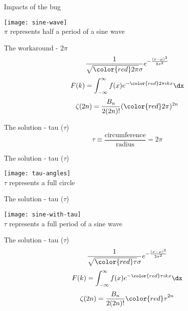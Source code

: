 \documentclass[14pt]{beamer}
\begin{document}
\begin{frame}{Impacts of the bug}
\begin{center}
\texttt{[image: sine-wave]}
\\$\pi$ represents half a period of a sine wave
\end{center}
\end{frame}

\begin{frame}{The workaround - $2\pi$}
\begin{equation*}
\frac{1}{\sqrt{\color{red}2\pi}\sigma}e^{-\frac{(x - \mu)^2}{2\sigma^2}}
\end{equation*}
\begin{equation*}
F(k) = \int_{-\infty}^{\infty}f(x)e^{-{\color{red}2\pi} i k x}\dx
\end{equation*}
\begin{equation*}
\zeta(2n) = \frac{B_n}{2(2n)!}({\color{red}2\pi})^{2n}
\end{equation*}
\end{frame}

\begin{frame}{The solution - tau ($\tau$)}
\huge
\begin{equation*}
\tau \equiv \frac{\textrm{circumference}}{\textrm{radius}} = 2\pi
\end{equation*}
\end{frame}

\begin{frame}{The solution - tau ($\tau$)}
\begin{center}
\texttt{[image: tau-angles]}
\\$\tau$ represents a full circle
\end{center}
\end{frame}

\begin{frame}{The solution - tau ($\tau$)}
\begin{center}
\texttt{[image: sine-with-tau]}
\\$\tau$ represents a full period of a sine wave
\end{center}
\end{frame}

\begin{frame}{The solution - tau ($\tau$)}
\begin{equation*}
\frac{1}{\sqrt{\color{red}\tau}\sigma}e^{-\frac{(x - \mu)^2}{2\sigma^2}}
\end{equation*}
\begin{equation*}
F(k) = \int_{-\infty}^{\infty}f(x)e^{-{\color{red}\tau} i k x}\dx
\end{equation*}
\begin{equation*}
\zeta(2n) = \frac{B_n}{2(2n)!}{\color{red}\tau}^{2n}
\end{equation*}
\end{frame}
\end{document}
